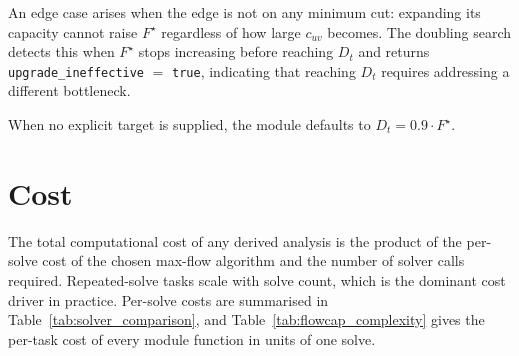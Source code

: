 \documentclass[12pt]{report}
\begin{document}
An edge case arises when the edge is not on any minimum cut: expanding its capacity cannot raise $F^\star$ regardless of how large $c_{uv}$ becomes. The doubling search detects this when $F^\star$ stops increasing before reaching $D_t$ and returns \texttt{upgrade\_ineffective} $=$ \texttt{true}, indicating that reaching $D_t$ requires addressing a different bottleneck. 

When no explicit target is supplied, the module defaults to $D_t = 0.9 \cdot F^\star$.




\section{Cost}
\label{sec:flow-cost}
The total computational cost of any derived analysis is the product of the per-solve cost of the chosen max-flow algorithm and the number of solver calls required. Repeated-solve tasks scale with solve count, which is the dominant cost driver in practice. Per-solve costs are summarised in Table~\ref{tab:solver_comparison}, and Table~\ref{tab:flowcap_complexity} gives the per-task cost of every module function in units of one solve.
\end{document}
